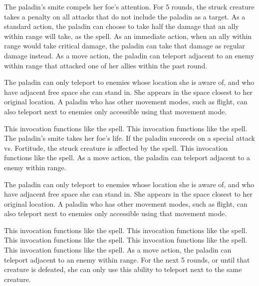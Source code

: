 The paladin's smite compels her foe's attention.
For 5 rounds, the struck creature takes a  penalty on all attacks that do not include the paladin as a target.
 As a standard action, the paladin can choose to take half the damage that an ally within \rngmed range will take, as the 
spell.
As an immediate action, when an ally within \rngmed range would take critical damage, the paladin can take that damage as regular damage instead.
As a move action, the paladin can teleport adjacent to an enemy within \rngmed range that attacked one of her allies within the past round.

The paladin can only teleport to enemies whose location she is aware of, and who have adjacent free space she can stand in.
She appears in the space closest to her original location.
A paladin who has other movement modes, such as flight, can also teleport next to enemies only accessible using that movement mode.

 This invocation functions like the 
spell.
 This invocation functions like the 
spell.
The paladin's smite takes her foe's life.
If the paladin succeeds on a special attack vs. Fortitude, the struck creature is affected by the  spell.
 This invocation functions like the 
spell.
As a move action, the paladin can teleport adjacent to a \bloodied enemy within \rngmed range.

The paladin can only teleport to enemies whose location she is aware of, and who have adjacent free space she can stand in.
She appears in the space closest to her original location.
A paladin who has other movement modes, such as flight, can also teleport next to enemies only accessible using that movement mode.

 This invocation functions like the 
spell.
 This invocation functions like the 
spell.
 This invocation functions like the 
spell.
 This invocation functions like the 
spell.
 This invocation functions like the 
spell.
As a move action, the paladin can teleport adjacent to an enemy within \rngmed range.
For the next 5 rounds, or until that creature is defeated, she can only use this ability to teleport next to the same creature.

